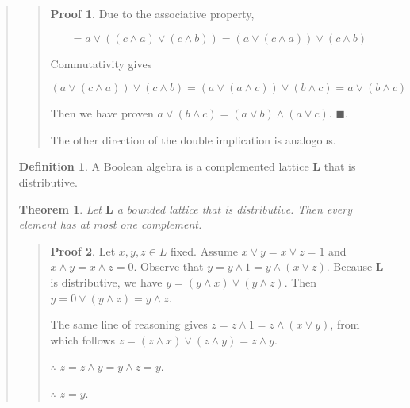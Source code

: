 \documentclass[a4paper, 12pt]{article}
\newtheorem{theorem}{Theorem}
\theoremstyle{definition}
\theoremstyle{definition}
\theoremstyle{definition}
\newtheorem{definition}{Definition}
\newtheorem{pro}{Proof}
\begin{document}
\begin{quote}
\begin{quote}
\begin{pro}
Due to the associative property, 

\begin{equation*}
    = a \lor \left( (c \land  a) \lor  (c \land  b) \right) = \left( a \lor (c \land a) \right) \lor (c \land b)
\end{equation*}

Commutativity gives

\begin{equation*}
    \left( a \lor (c \land a) \right) \lor (c \land b) = (a \lor  (a \land  c)) \lor (b \land  c) = a \lor (b \land  c)
\end{equation*}

Then we have proven $a \lor (b \land  c) = (a \lor  b) \land  (a \lor c)$. $\blacksquare$.

The other direction of the double implication is analogous.

\end{pro}

\end{quote}
\normalsize

\begin{definition}
    A Boolean algebra is a complemented lattice $\textbf{L}$ that is distributive.
\end{definition}

\begin{theorem}
    Let $\textbf{L}$ a bounded lattice that is distributive. Then every element 
    has at most one complement.
\end{theorem}


\small
\begin{quote}

\begin{pro}
    Let $x, y, z \in L$ fixed. Assume $x \lor  y = x \lor  z = 1$ 
    and $x \land  y = x \land  z = 0$. Observe that 
    $y = y \land  1 = y \land (x \lor  z)$. Because $\textbf{L}$ is 
    distributive, we have $y = (y \land  x) \lor  (y \land  z)$.
    Then $y = 0 \lor  (y \land   z) = y \land  z$.

    The same line of reasoning gives $z = z \land  1 = z \land  (x \lor  y)$, from
    which follows $z = (z \land  x) \lor  (z \land  y) = z \land  y$.

    $\therefore $ $z = z \land  y = y \land  z = y$.

    $\therefore $ $z = y$.
\end{pro}

\end{quote}
\normalsize


\end{quote}
\end{document}
